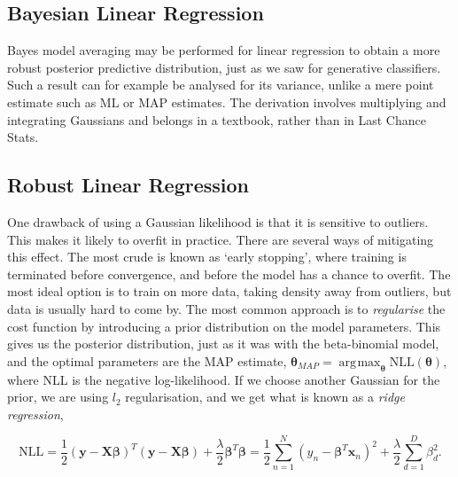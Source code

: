 \documentclass[11pt]{amsart}
\DeclareMathOperator*{\argmax}{\arg\!\max}
\begin{document}
\subsection{Bayesian Linear Regression}

Bayes model averaging may be performed for linear regression to obtain a more robust posterior predictive distribution, just as we saw for generative classifiers. Such a result can for example be analysed for its variance, unlike a mere point estimate such as ML or MAP estimates. The derivation involves multiplying and integrating Gaussians and belongs in a textbook, rather than in Last Chance Stats.

\subsection{Robust Linear Regression}

One drawback of using a Gaussian likelihood is that it is sensitive to outliers. This makes it likely to overfit in practice. There are several ways of mitigating this effect. The most crude is known as `early stopping', where training is terminated before convergence, and before the model has a chance to overfit. The most ideal option is to train on more data, taking density away from outliers, but data is usually hard to come by. The most common approach is to \emph{regularise} the cost function by introducing a prior distribution on the model parameters. This gives us the posterior distribution, just as it was with the beta-binomial model, and the optimal parameters are the MAP estimate, $\boldsymbol\theta_{MAP} = \argmax_{\boldsymbol\theta} \text{NLL}(\boldsymbol\theta)$, where NLL is the negative log-likelihood. If we choose another Gaussian for the prior, we are using $l_2$ regularisation, and we get what is known as a \emph{ridge regression},

$$\text{NLL} = \frac{1}{2}(\mathbf{y} - \mathbf{X}\boldsymbol\beta)^T(\mathbf{y} - \mathbf{X}\boldsymbol\beta) + \frac{\lambda}{2}\boldsymbol\beta^T\boldsymbol\beta = \frac{1}{2}\sum_{n=1}^N(y_n - \boldsymbol\beta^T\mathbf{x}_n)^2 + \frac{\lambda}{2}\sum_{d=1}^D\beta_d^2.$$
\end{document}
